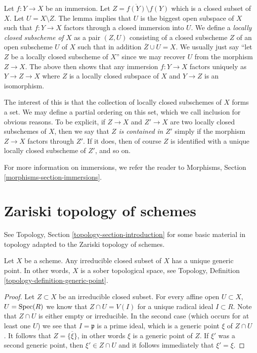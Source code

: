 \noindent
Let $f : Y \to X$ be an immersion.
Let $Z = \overline{f(Y)} \setminus f(Y)$ which is a closed subset of $X$.
Let $U = X \setminus Z$.
The lemma implies that $U$ is the biggest open subspace of $X$
such that $f : Y \to X$ factors through a closed immersion into $U$.
We define a {\it locally closed subscheme of $X$} as a pair
$(Z, U)$ consisting of a closed subscheme $Z$ of an open subscheme $U$
of $X$ such that in addition $\overline{Z} \cup U = X$. We usually
just say ``let $Z$ be a locally closed subscheme of $X$'' since we may
recover $U$ from the morphism $Z \to X$. The above
then shows that any immersion $f : Y \to X$ factors uniquely
as $Y \to Z \to X$ where $Z$ is a locally closed subspace of $X$
and $Y \to Z$ is an isomorphism.

\medskip\noindent
The interest of this is that the collection of locally closed subschemes
of $X$ forms a set. We may define a partial ordering on this set,
which we call inclusion for obvious reasons. To be explicit, if
$Z \to X$ and $Z' \to X$ are two locally closed subschemes of $X$, then
we say that {\it $Z$ is contained in $Z'$} simply if the morphism
$Z \to X$ factors through $Z'$. If it does, then of course $Z$ is identified
with a unique locally closed subscheme of $Z'$, and so on.

\medskip\noindent
For more information on immersions, we refer the reader to
Morphisms, Section \ref{morphisms-section-immersions}.










\section{Zariski topology of schemes}
\label{section-topology}

\noindent
See Topology, Section \ref{topology-section-introduction}
for some basic material in topology adapted to the Zariski
topology of schemes.

\begin{lemma}
\label{lemma-scheme-sober}
Let $X$ be a scheme.
Any irreducible closed subset of $X$ has a unique generic point.
In other words, $X$ is a sober topological space, see
Topology, Definition \ref{topology-definition-generic-point}.
\end{lemma}

\begin{proof}
Let $Z \subset X$ be an irreducible closed subset.
For every affine open $U \subset X$, $U = \mathop{\mathrm{Spec}}(R)$
we know that $Z \cap U = V(I)$ for a unique
radical ideal $I \subset R$. Note that $Z \cap U$ is either
empty or irreducible. In the second case (which occurs
for at least one $U$) we see that $I = \mathfrak p$
is a prime ideal, which is a generic point $\xi$ of $Z \cap U$.
It follows that $Z = \overline{\{\xi\}}$, in other words
$\xi$ is a generic point of $Z$. If $\xi'$ was a second
generic point, then $\xi' \in Z \cap U$ and it follows
immediately that $\xi' = \xi$.
\end{proof}

